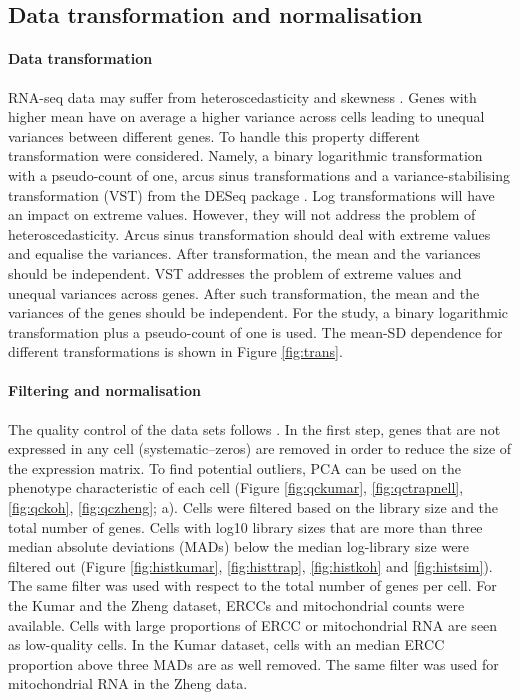 \documentclass[12pt, a4paper]{article}\usepackage[]{graphicx}\usepackage[]{color}
\begin{document}
\newpage
\subsection{Data transformation and normalisation}\label{ssec:norm}
\paragraph{Data transformation}
RNA-seq data may suffer from heteroscedasticity and skewness \citep{zwiener2014transforming}. Genes with higher mean have on average a higher variance across cells leading to unequal variances between different genes. 
To handle this property different transformation were considered. Namely, a binary logarithmic transformation with a pseudo-count of one, arcus sinus transformations and a variance-stabilising transformation (VST) from the DESeq package \citep{huber2002variance}. Log transformations will have an impact on extreme values. However, they will not address the problem of heteroscedasticity. Arcus sinus transformation should deal with extreme values and equalise the variances. After transformation, the mean and the variances should be independent. VST addresses the problem of extreme values and unequal variances across genes. After such transformation, the mean and the variances of the genes should be independent. For the study, a binary logarithmic transformation plus a pseudo-count of one is used.  The mean-SD dependence for different transformations is shown in Figure \ref{fig:trans}.

\newpage
\paragraph{Filtering and normalisation}
The quality control of the data sets follows \citet{lun2016step}. In the first step, genes that are not expressed in any cell (systematic--zeros) are removed in order to reduce the size of the expression matrix. To find potential outliers, PCA can be used on the phenotype characteristic of each cell (Figure \ref{fig:qckumar}, \ref{fig:qctrapnell}, \ref{fig:qckoh}, \ref{fig:qczheng}; a). Cells were filtered based on the library size and the total number of genes.
Cells with log10 library sizes that are more than three median absolute deviations (MADs) below the median log-library size were filtered out (Figure \ref{fig:histkumar}, \ref{fig:histtrap}, \ref{fig:histkoh} and \ref{fig:histsim}). The same filter was used with respect to the total number of genes per cell. 
For the Kumar and the Zheng dataset, ERCCs and mitochondrial counts were available. Cells with large proportions of ERCC or mitochondrial RNA are seen as low-quality cells. In the Kumar dataset, cells with an median ERCC proportion above three MADs are as well removed. The same filter was used for mitochondrial RNA in the Zheng data.
\end{document}
